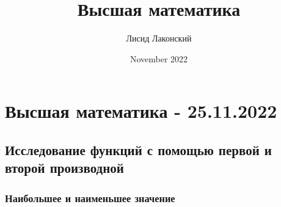 \documentclass{article}
\title{Высшая математика}
\author{Лисид Лаконский}
\date{November 2022}
\begin{document}
\maketitle

\tableofcontents
\pagebreak

\section{Высшая математика - 25.11.2022}

\subsection{Исследование функций с помощью первой и второй производной}

\subsubsection{Наибольшее и наименьшее значение}
\end{document}
